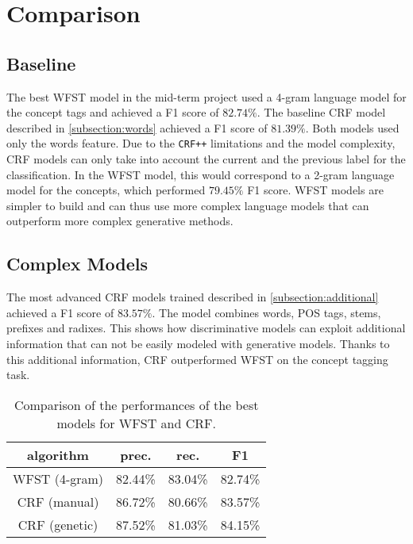 \section{Comparison}
\label{sec:comparison}

\subsection{Baseline}
The best \ac{WFST} model in the mid-term project used a 4-gram language model for the concept tags and achieved a F1 score of $82.74\%$.
The baseline \ac{CRF} model described in \cref{subsection:words} achieved a F1 score of $81.39\%$.
Both models used only the words feature.
Due to the \texttt{CRF++} limitations and the model complexity, \ac{CRF} models can only take into account the current and the previous label for the classification.
In the \ac{WFST} model, this would correspond to a 2-gram language model for the concepts, which performed $79.45\%$ F1 score.
\ac{WFST} models are simpler to build and can thus use more complex language models that can outperform more complex generative methods.

\subsection{Complex Models}
The most advanced \ac{CRF} models trained described in \cref{subsection:additional} achieved a F1 score of $83.57\%$.
The model combines words, POS tags, stems, prefixes and radixes.
This shows how discriminative models can exploit additional information that can not be easily modeled with generative models.
Thanks to this additional information, \ac{CRF} outperformed \ac{WFST} on the concept tagging task.

\begin{table}[h]
	\centering
    \begin{tabular}{ c c c c }
    	\toprule
    		\multicolumn{1}{c}{algorithm} & \multicolumn{1}{c}{prec.} & \multicolumn{1}{c}{rec.} & \multicolumn{1}{c}{F1} \\
    	\midrule
            WFST (4-gram) & 82.44\% & 83.04\% & 82.74\% \\
            CRF (manual) & 86.72\% & 80.66\% & 83.57\% \\
			CRF (genetic) & 87.52\% & 81.03\% & 84.15\% \\
    	\bottomrule
	\end{tabular}
    \caption{Comparison of the performances of the best models for \ac{WFST} and \ac{CRF}.}
	\label{tab:best}
\end{table}

